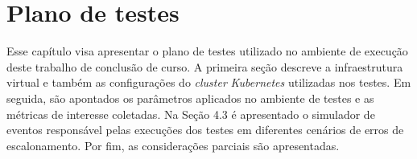 
\chapter{Plano de testes}
Esse capítulo visa apresentar o plano de testes utilizado no ambiente de execução deste trabalho de conclusão de curso. A primeira seção descreve a infraestrutura virtual e também as configurações do \textit{cluster} \textit{Kubernetes} utilizadas nos testes. Em seguida, são apontados os parâmetros aplicados no ambiente de testes e as métricas de interesse coletadas. Na Seção 4.3 é apresentado o simulador de eventos responsável pelas execuções dos testes em diferentes cenários de erros de escalonamento. Por fim, as considerações parciais são apresentadas.



